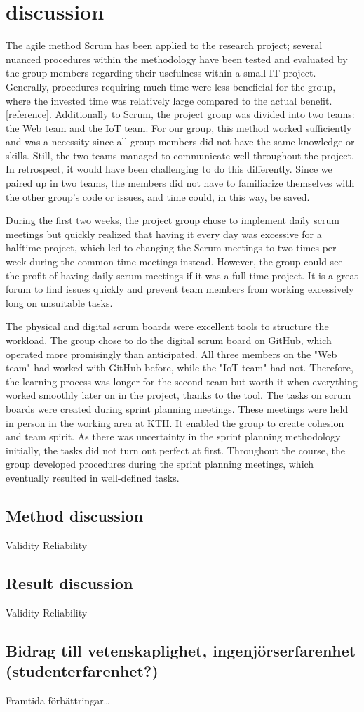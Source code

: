 
\section{discussion}
The agile method Scrum has been applied to the research project; several nuanced procedures within the methodology have been tested and evaluated by the group members regarding their usefulness within a small IT project. Generally, procedures requiring much time were less beneficial for the group, where the invested time was relatively large compared to the actual benefit.[reference]. Additionally to Scrum, the project group was divided into two teams: the Web team and the IoT team. For our group, this method worked sufficiently and was a necessity since all group members did not have the same knowledge or skills. Still, the two teams managed to communicate well throughout the project. In retrospect, it would have been challenging to do this differently. Since we paired up in two teams, the members did not have to familiarize themselves with the other group's code or issues, and time could, in this way, be saved.

During the first two weeks, the project group chose to implement daily scrum meetings but quickly realized that having it every day was excessive for a halftime project, which led to changing the Scrum meetings to two times per week during the common-time meetings instead. However, the group could see the profit of having daily scrum meetings if it was a full-time project. It is a great forum to find issues quickly and prevent team members from working excessively long on unsuitable tasks. 

The physical and digital scrum boards were excellent tools to structure the workload. The group chose to do the digital scrum board on GitHub, which operated more promisingly than anticipated. All three members on the "Web team" had worked with GitHub before, while the "IoT team" had not. Therefore, the learning process was longer for the second team but worth it when everything worked smoothly later on in the project, thanks to the tool. The tasks on scrum boards were created during sprint planning meetings. These meetings were held in person in the working area at KTH. It enabled the group to create cohesion and team spirit. As there was uncertainty in the sprint planning methodology initially, the tasks did not turn out perfect at first. Throughout the course, the group developed procedures during the sprint planning meetings, which eventually resulted in well-defined tasks.

\subsection{Method discussion}
Validity
Reliability

\subsection{Result discussion}
Validity
Reliability

\subsection{Bidrag till vetenskaplighet, ingenjörserfarenhet (studenterfarenhet?)}
Framtida förbättringar\dots
